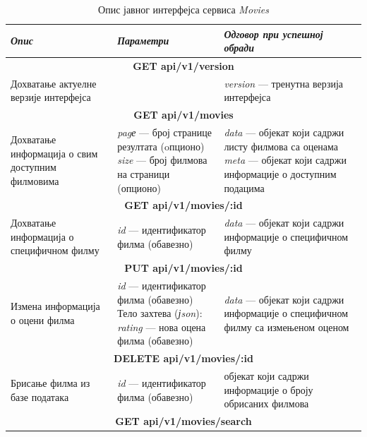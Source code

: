 \documentclass[12pt,oneside]{memoir}
\begin{document}
\begin{table}
\caption{Опис јавног интерфејса сервиса  \textit{Movies} }
\label{tbl:moviesAPI}
\begin{center}
\begin{tabular}{ |  p{0.3\linewidth} | p{0.3\linewidth}|  p{0.4\linewidth} | }
 
 \hline
  \textit{Опис} & \textit{Параметри} & \textit{Одговор при успешној обради} \\
  \hline
  \multicolumn{3}{|c|}{\textbf{GET api/v1/version}} \\
  \hline
  Дохватање актуелне верзије интерфејса
  & 
  
  & 
 \textit{version} --- тренутна верзија интерфејса \\
  \hline
 \multicolumn{3}{|c|}{\textbf{GET api/v1/movies}} \\
  \hline
  Дохватање информација о свим доступним филмовима
  & 
  \textit{pagе} --- број странице резултата (oпционо) \newline 
  \textit{size} --- број филмова на страници (опционо)
  & 
  \textit{data} --- објекат који садржи листу филмова са оценама \newline  
  \textit{meta} --- објекат који садржи информације о доступним подацима \\
   \hline
   \multicolumn{3}{|c|}{\textbf{GET api/v1/movies/:id}} \\
  \hline
  Дохватање информација о специфичном филму 
  & 
  \textit{id} --- идентификатор филма (обавезно)
  & 
  \textit{data} --- објекат који садржи информације о специфичном филму\\
   \hline
   \multicolumn{3}{|c|}{\textbf{PUT api/v1/movies/:id}} \\
  \hline
  Измена информација о оцени филма
  & 
  \textit{id} --- идентификатор филма (обавезно)
 \newline
  Тело захтева (\textit{јson}):  \newline
  \textit{rating} --- нова оцена филма (обавезно)
  & 
  \textit{data} --- објекат који садржи информације о специфичном филму са измењеном оценом\\
  \hline
   \multicolumn{3}{|c|}{\textbf{DELETE api/v1/movies/:id}} \\
  \hline
 	Брисање  филма из базе података
  & 
  \textit{id} --- идентификатор филма (обавезно)
  & 
 	објекат који садржи информације о броју обрисаних филмова\\
	\hline
   \multicolumn{3}{|c|}{\textbf{GET api/v1/movies/search}} \\

\end{tabular}
\end{center}
\end{table}
\end{document}
